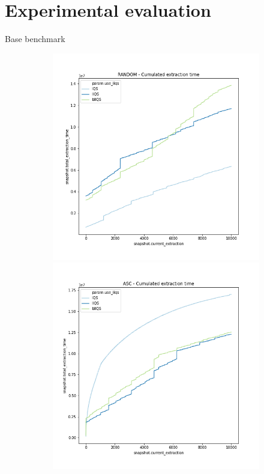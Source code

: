 \documentclass{beamer}
\begin{document}
\section{Experimental evaluation}


\begin{frame}{Base benchmark}
    \begin{figure}
        \centering
        \begin{subfigure}[b]{\textwidth}
            \centering
            \includegraphics[height=0.45\textheight]{chapter5/01-basebenchmark-01-random-case.png.0-0.png}
            \includegraphics[height=0.45\textheight]{chapter5/01-basebenchmark-02-sort-a-case.png.0-0.png}

\end{subfigure}
\end{figure}
\end{frame}
\end{document}

